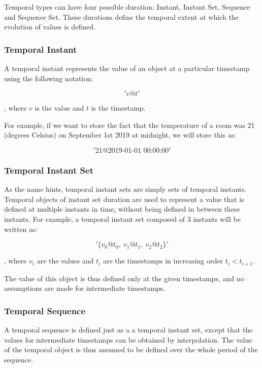 Temporal types can have four possible duration: Instant, Instant Set, Sequence and Sequence Set. These durations define the temporal extent at which the evolution of values is defined.

\subsubsection{Temporal Instant}
\label{section:mobilitydb_inst}

A temporal instant represents the value of an object at a particular timestamp using the following notation:

\[
    'v@t'
\]

, where \(v\) is the value and \(t\) is the timestamp.

For example, if we want to store the fact that the temperature of a room was 21 (degrees Celsius) on September 1st 2019 at midnight, we will store this as:

\[
    '21@\text{2019-01-01 00:00:00}'
\]

\subsubsection{Temporal Instant Set}
\label{section:mobilitydb_i}

As the name hints, temporal instant sets are simply sets of temporal instants. Temporal objects of instant set duration are used to represent a value that is defined at multiple instants in time, without being defined in between these instants. For example, a temporal instant set composed of 3 instants will be written as:

\[
    '\{v_0@t_0,\ v_1@t_1,\ v_2@t_2\}'
\]

, where \(v_i\) are the values and \(t_i\) are the timestamps in increasing order \(t_i < t_{i+1}\).

The value of this object is thus defined only at the given timestamps, and no assumptions are made for intermediate timestamps.

\subsubsection{Temporal Sequence}
\label{section:mobilitydb_seq}

A temporal sequence is defined just as a a temporal instant set, except that the values for intermediate timestamps can be obtained by interpolation. The value of the temporal object is thus assumed to be defined over the whole period of the sequence.

